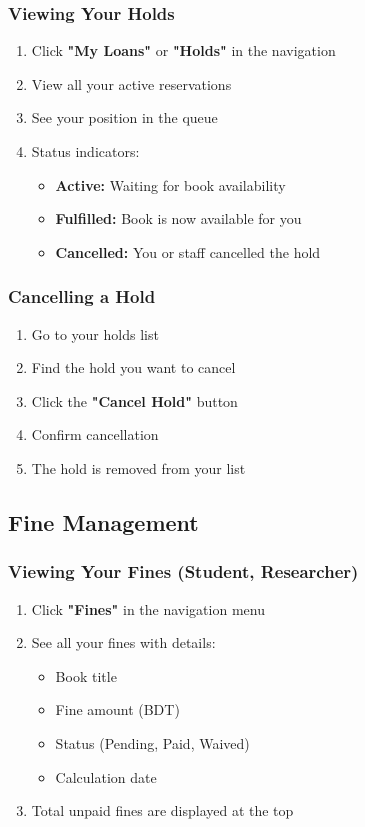 \documentclass[12pt,a4paper]{article}
\begin{document}
\subsubsection{Viewing Your Holds}
\begin{enumerate}[leftmargin=*]
    \item Click \textbf{"My Loans"} or \textbf{"Holds"} in the navigation
    \item View all your active reservations
    \item See your position in the queue
    \item Status indicators:
        \begin{itemize}
            \item \textbf{Active:} Waiting for book availability
            \item \textbf{Fulfilled:} Book is now available for you
            \item \textbf{Cancelled:} You or staff cancelled the hold
        \end{itemize}
\end{enumerate}

\subsubsection{Cancelling a Hold}
\begin{enumerate}[leftmargin=*]
    \item Go to your holds list
    \item Find the hold you want to cancel
    \item Click the \textbf{"Cancel Hold"} button
    \item Confirm cancellation
    \item The hold is removed from your list
\end{enumerate}

\subsection{Fine Management}

\subsubsection{Viewing Your Fines (Student, Researcher)}
\begin{enumerate}[leftmargin=*]
    \item Click \textbf{"Fines"} in the navigation menu
    \item See all your fines with details:
        \begin{itemize}
            \item Book title
            \item Fine amount (BDT)
            \item Status (Pending, Paid, Waived)
            \item Calculation date
        \end{itemize}
    \item Total unpaid fines are displayed at the top
\end{enumerate}
\end{document}
